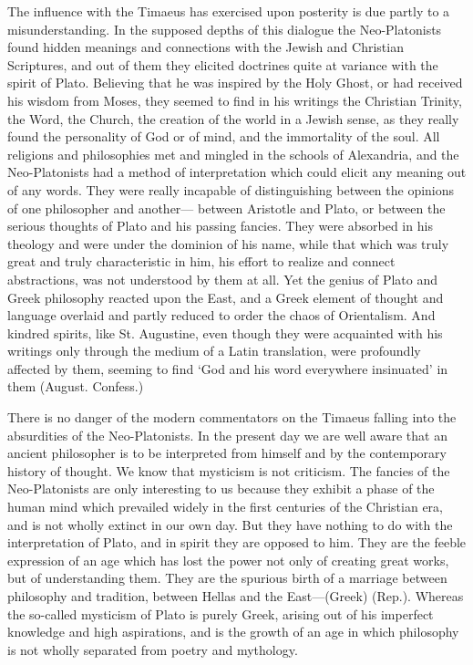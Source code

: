 The influence with the Timaeus has exercised upon posterity is due partly
to a misunderstanding. In the supposed depths of this dialogue the
Neo-Platonists found hidden meanings and connections with the Jewish and
Christian Scriptures, and out of them they elicited doctrines quite at
variance with the spirit of Plato. Believing that he was inspired by the
Holy Ghost, or had received his wisdom from Moses, they seemed to find in
his writings the Christian Trinity, the Word, the Church, the creation of
the world in a Jewish sense, as they really found the personality of God
or of mind, and the immortality of the soul. All religions and
philosophies met and mingled in the schools of Alexandria, and the
Neo-Platonists had a method of interpretation which could elicit any
meaning out of any words. They were really incapable of distinguishing
between the opinions of one philosopher and another— between
Aristotle and Plato, or between the serious thoughts of Plato and his
passing fancies. They were absorbed in his theology and were under the
dominion of his name, while that which was truly great and truly
characteristic in him, his effort to realize and connect abstractions, was
not understood by them at all. Yet the genius of Plato and Greek
philosophy reacted upon the East, and a Greek element of thought and
language overlaid and partly reduced to order the chaos of Orientalism.
And kindred spirits, like St. Augustine, even though they were acquainted
with his writings only through the medium of a Latin translation, were
profoundly affected by them, seeming to find ‘God and his word everywhere
insinuated’ in them (August. Confess.)

There is no danger of the modern commentators on the Timaeus falling into
the absurdities of the Neo-Platonists. In the present day we are well
aware that an ancient philosopher is to be interpreted from himself and by
the contemporary history of thought. We know that mysticism is not
criticism. The fancies of the Neo-Platonists are only interesting to us
because they exhibit a phase of the human mind which prevailed widely in
the first centuries of the Christian era, and is not wholly extinct in our
own day. But they have nothing to do with the interpretation of Plato, and
in spirit they are opposed to him. They are the feeble expression of an
age which has lost the power not only of creating great works, but of
understanding them. They are the spurious birth of a marriage between
philosophy and tradition, between Hellas and the East—(Greek)
(Rep.). Whereas the so-called mysticism of Plato is purely Greek, arising
out of his imperfect knowledge and high aspirations, and is the growth of
an age in which philosophy is not wholly separated from poetry and
mythology.

